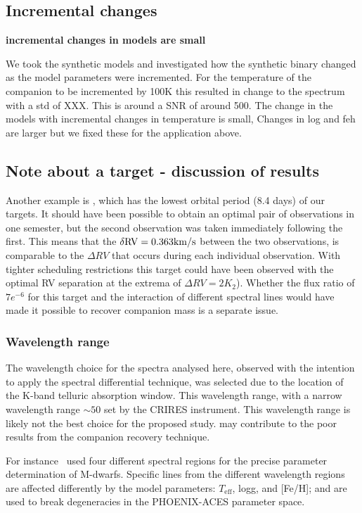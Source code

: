 \subsection{Incremental changes}
\textbf{incremental changes in models are small}

We took the synthetic models and investigated how the synthetic binary changed as the model parameters were incremented.  For the temperature of the companion to be incremented by 100K this resulted in change to the spectrum with a std of XXX. This is around a SNR of around 500.
The change in the models with incremental changes in temperature is small, Changes in log and feh are larger but we fixed these for the application above.





\subsection{Note about a target - discussion of results}
Another example is , which has the lowest orbital period (8.4 days) of our targets. It should have been possible to obtain an optimal pair of observations in one semester, but the second observation was taken immediately following the first. This means that the \(\rm \delta RV = 0.363 km/s \) between the two observations, is comparable to the \(\Delta RV \) that occurs during each individual observation. With tighter scheduling restrictions this target could have been observed with the optimal RV separation at the extrema of \(\Delta RV=2 K_{2}\)). Whether the flux ratio of \(7e^{-6}\) for this target and the interaction of different spectral lines would have made it possible to recover companion mass is a separate issue.



\subsubsection {Wavelength range}
The wavelength choice for the spectra analysed here, observed with the intention to apply the spectral differential technique, was selected due to the location of the K-band telluric absorption window. This wavelength range, with a narrow wavelength range \(\sim50\)\nm{} set by the CRIRES instrument. This wavelength range is likely not the best choice for the proposed study. may contribute to the poor results from the companion recovery technique.

For instance~\citet{passegger_fundamental_2016} used four different spectral regions for the precise parameter determination of M-dwarfs. Specific lines from the different wavelength regions are affected differently by the model parameters: \(T_{\textrm{eff}}\), logg, and [Fe/H]; and are used to break degeneracies in the PHOENIX-ACES parameter space.

